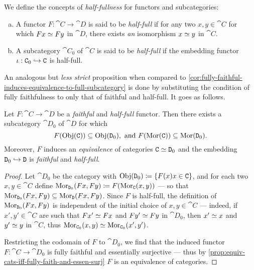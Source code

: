 \begin{definition}
\label{def:half-full}
We define the concepts of \emph{half-fullness} for functors and subcategories:
\begin{enumerate}[(a)]\setlength\itemsep{0em}
\item A functor \(F: \cat C \to \cat D\) is said to be \emph{half-full} if for
  any two \(x, y \in \cat C\) for which \(F x \simeq F y\) in \(\cat D\), there
  exists \emph{an} isomorphism \(x \simeq y\) in \(\cat C\).

\item A subcategory \(\cat C_0\) of \(\cat C\) is said to be \emph{half-full} if
  the embedding functor \(\iota: \texttt C_0 \hookrightarrow \texttt C\) is half-full.
\end{enumerate}
\end{definition}

An analogous but \emph{less strict} proposition when compared to
\cref{cor:fully-faithful-induces-equivalence-to-full-subcategory} is done by
substituting the condition of fully faithfulness to only that of faithful and
half-full. It goes as follows.

\begin{proposition}
\label{prop:faithful-half-full-induces-equivalence-to-subcategory}
Let \(F: \cat C \to \cat D\) be a \emph{faithful} and \emph{half-full}
functor. Then there exists a subcategory \(\cat D_0\) of \(\cat D\) for which
\[
F(\operatorname{Obj}(\texttt C)) \subseteq \operatorname{Obj}(\texttt D_0),
\text{ and }
F(\operatorname{Mor}(\texttt C)) \subseteq \operatorname{Mor}(\texttt D_0).
\]
Moreover, \(F\) induces an \emph{equivalence} of categories
\(\texttt C \simeq \texttt D_0\) and the embedding
\(\texttt D_0 \hookrightarrow \texttt D\) is \emph{faithful} and
\emph{half-full}.
\end{proposition}

\begin{proof}
Let \(\cat D_0\) be the category with
\(\operatorname{Obj}(\texttt D_0) \coloneq \{F(x) \relax x \in \texttt C\}\), and for each two
\(x, y \in \cat C\) define
\(\operatorname{Mor}_{\texttt D_0}(F x, F y) \coloneq F(\operatorname{Mor}_{\texttt C}(x, y))\) --- so that
\(\operatorname{Mor}_{\texttt D_0}(F x, F y) \subseteq \operatorname{Mor}_{\texttt D}(F x, F y)\). Since \(F\) is
half-full, the definition of \(\operatorname{Mor}_{\texttt D_0}(F x, F y)\) is independent of the
initial choice of \(x, y \in \cat C\) --- indeed, if \(x', y' \in \cat C\) are
such that \(F x' \simeq F x\) and \(F y' \simeq F y\) in \(\cat D_0\), then \(x'
\simeq x\) and \(y' \simeq y\) in \(\cat C\), thus \(\operatorname{Mor}_{\texttt C_0}(x, y) \simeq
\operatorname{Mor}_{\texttt C_0}(x', y')\).

Restricting the codomain of \(F\) to \(\cat D_0\), we find that the induced
functor \(F: \cat C \to \cat D_0\) is fully faithful and essentially surjective
--- thus by \cref{prop:equiv-cats-iff-fully-faith-and-essen-surj} \(F\) is an
equivalence of categories.
\end{proof}

